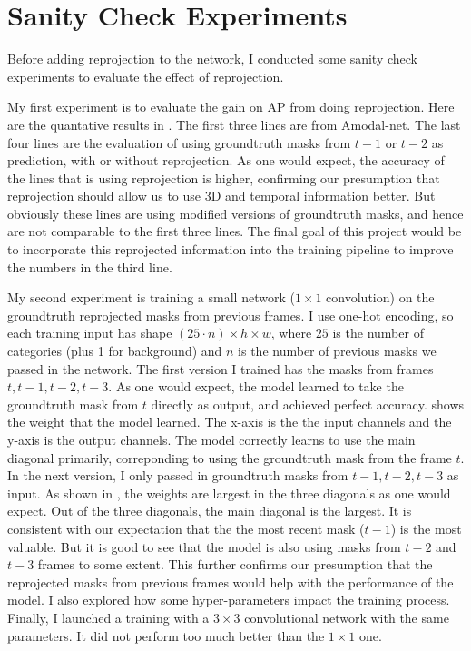 \section{Sanity Check Experiments}
Before adding reprojection to the network, I conducted some sanity check experiments to evaluate the effect of reprojection. 

My first experiment is to evaluate the gain on AP from doing reprojection. Here are the quantative results in . The first three lines are from Amodal-net. The last four lines are the evaluation of using groundtruth masks from $t-1$ or $t-2$ as prediction, with or without reprojection. As one would expect, the accuracy of the lines that is using reprojection is higher, confirming our presumption that reprojection should allow us to use 3D and temporal information better. But obviously these lines are using modified versions of groundtruth masks, and hence are not comparable to the first three lines. The final goal of this project would be to incorporate this reprojected information into the training pipeline to improve the numbers in the third line.

My second experiment is training a small network ($1 \times 1$ convolution) on the groundtruth reprojected masks from previous frames. I use one-hot encoding, so each training input has shape $(25\cdot n) \times h \times w$, where $25$ is the number of categories (plus 1 for background) and $n$ is the number of previous masks we passed in the network. The first version I trained has the masks from frames $t,t-1,t-2,t-3$. As one would expect, the model learned to take the groundtruth mask from $t$ directly as output, and achieved perfect accuracy.  shows the weight that the model learned. The x-axis is the the input channels and the y-axis is the output channels. The model correctly learns to use the main diagonal primarily, correponding to using the groundtruth mask from the frame $t$. In the next version, I only passed in groundtruth masks from $t-1,t-2,t-3$ as input. As shown in , the weights are largest in the three diagonals as one would expect. Out of the three diagonals, the main diagonal is the largest. It is consistent with our expectation that the the most recent mask ($t-1$) is the most valuable. But it is good to see that the model is also using masks from $t-2$ and $t-3$ frames to some extent. This further confirms our presumption that the reprojected masks from previous frames would help with the performance of the model. I also explored how some hyper-parameters impact the training process. Finally, I launched a training with a $3\times 3$ convolutional network with the same parameters. It did not perform too much better than the $1\times 1$ one. 

